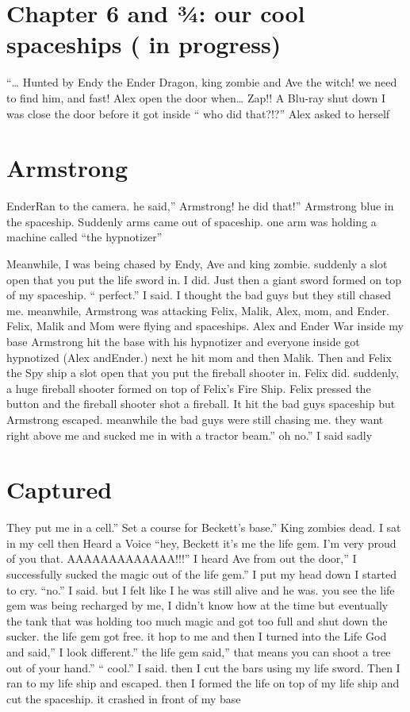 \documentclass[12pt,oneside]{krantz}
\begin{document}
\hypertarget{chapter-6-and-our-cool-spaceships-in-progress}{%
\chapter{Chapter 6 and ¾: our cool spaceships ( in
progress)}\label{chapter-6-and-our-cool-spaceships-in-progress}}

``\ldots{} Hunted by Endy the Ender Dragon, king zombie and Ave the
witch! we need to find him, and fast! Alex open the door when\ldots{}
Zap!! A Blu-ray shut down I was close the door before it got inside ``
who did that?!?'' Alex asked to herself

\hypertarget{armstrong}{%
\chapter{Armstrong}\label{armstrong}}

EnderRan to the camera. he said,'' Armstrong! he did that!'' Armstrong
blue in the spaceship. Suddenly arms came out of spaceship. one arm was
holding a machine called ``the hypnotizer''

Meanwhile, I was being chased by Endy, Ave and king zombie. suddenly a
slot open that you put the life sword in. I did. Just then a giant sword
formed on top of my spaceship. `` perfect.'' I said. I thought the bad
guys but they still chased me. meanwhile, Armstrong was attacking Felix,
Malik, Alex, mom, and Ender. Felix, Malik and Mom were flying and
spaceships. Alex and Ender War inside my base Armstrong hit the base
with his hypnotizer and everyone inside got hypnotized (Alex andEnder.)
next he hit mom and then Malik. Then and Felix the Spy ship a slot open
that you put the fireball shooter in. Felix did. suddenly, a huge
fireball shooter formed on top of Felix's Fire Ship. Felix pressed the
button and the fireball shooter shot a fireball. It hit the bad guys
spaceship but Armstrong escaped. meanwhile the bad guys were still
chasing me. they want right above me and sucked me in with a tractor
beam.'' oh no.'' I said sadly

\hypertarget{captured}{%
\chapter{Captured}\label{captured}}

They put me in a cell.'' Set a course for Beckett's base.'' King zombies
dead. I sat in my cell then Heard a Voice ``hey, Beckett it's me the
life gem. I'm very proud of you that. AAAAAAAAAAAAA!!!'' I heard Ave
from out the door,'' I successfully sucked the magic out of the life
gem.'' I put my head down I started to cry. ``no.'' I said. but I felt
like I he was still alive and he was. you see the life gem was being
recharged by me, I didn't know how at the time but eventually the tank
that was holding too much magic and got too full and shut down the
sucker. the life gem got free. it hop to me and then I turned into the
Life God and said,'' I look different.'' the life gem said,'' that means
you can shoot a tree out of your hand.'' `` cool.'' I said. then I cut
the bars using my life sword. Then I ran to my life ship and escaped.
then I formed the life on top of my life ship and cut the spaceship. it
crashed in front of my base
\end{document}
